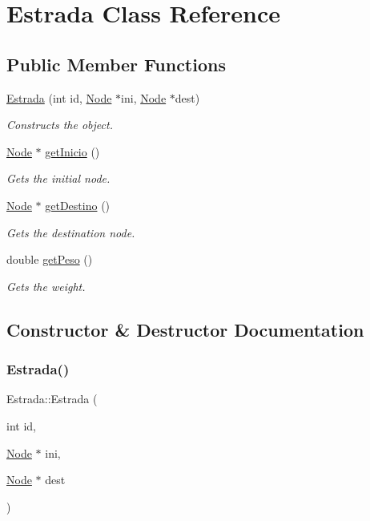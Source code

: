 \hypertarget{class_estrada}{}\section{Estrada Class Reference}
\label{class_estrada}
\subsection*{Public Member Functions}
\begin{DoxyCompactItemize}
\item 
\mbox{\hyperlink{class_estrada_acecd36ce82ab5d03bc2230f714a6fb82}{Estrada}} (int id, \mbox{\hyperlink{class_node}{Node}} $\ast$ini, \mbox{\hyperlink{class_node}{Node}} $\ast$dest)
\begin{DoxyCompactList}\small\item\em Constructs the object. \end{DoxyCompactList}\item 
\mbox{\hyperlink{class_node}{Node}} $\ast$ \mbox{\hyperlink{class_estrada_affaaa28b8106f457fe8492adb189844d}{get\+Inicio}} ()
\begin{DoxyCompactList}\small\item\em Gets the initial node. \end{DoxyCompactList}\item 
\mbox{\hyperlink{class_node}{Node}} $\ast$ \mbox{\hyperlink{class_estrada_a2976f57973d90e0069d0c3cb1b6ebd7b}{get\+Destino}} ()
\begin{DoxyCompactList}\small\item\em Gets the destination node. \end{DoxyCompactList}\item 
double \mbox{\hyperlink{class_estrada_a30dfca6446f39f9bea4fcede9ed8b77e}{get\+Peso}} ()
\begin{DoxyCompactList}\small\item\em Gets the weight. \end{DoxyCompactList}\end{DoxyCompactItemize}


\subsection{Constructor \& Destructor Documentation}
\mbox{\label{class_estrada_acecd36ce82ab5d03bc2230f714a6fb82}} 
\subsubsection{\texorpdfstring{Estrada()}{Estrada()}}
{\footnotesize\ttfamily Estrada\+::\+Estrada (\begin{DoxyParamCaption}\item[{int}]{id,  }\item[{\mbox{\hyperlink{class_node}{Node}} $\ast$}]{ini,  }\item[{\mbox{\hyperlink{class_node}{Node}} $\ast$}]{dest }\end{DoxyParamCaption})}



